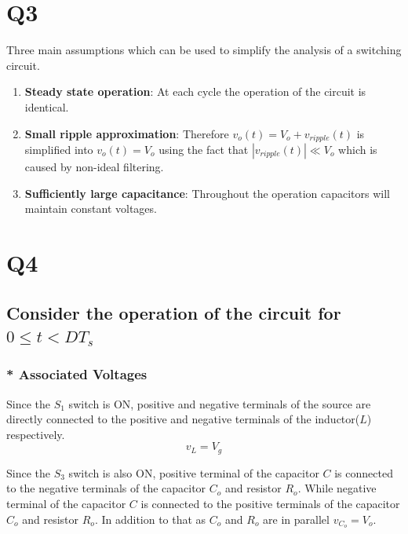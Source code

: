 \documentclass[a4paper,11pt]{article}%
\begin{document}
\section*{Q3}
Three main assumptions which can be used to simplify the analysis of a switching	circuit.
\begin{enumerate}
	\item \textbf{Steady state operation}: At each cycle the operation of the circuit is identical.
	\item \textbf{Small ripple approximation}: Therefore $ v_o(t) = V_o + v_{ripple}(t)$ is simplified into $v_o(t) = V_o$ using the fact that $| v_{ripple}(t)| \ll V_o$ which is caused by non-ideal filtering.

	\item \textbf{Sufficiently large capacitance}: Throughout the operation capacitors will maintain constant voltages.
\end{enumerate}

\pagebreak
\section*{Q4}

\subsection*{Consider the operation of the circuit for $0\leq t < DT_s$}

\subsubsection*{* Associated Voltages}
Since the $S_1$ switch is ON, positive and negative terminals of the source are directly connected to the positive and negative terminals of the inductor($L$) respectively.
\begin{equation}
	 v_L =  V_g
	 \label{first}
\end{equation}


Since the $S_3$ switch is also ON, positive terminal of the capacitor $C$ is connected to the negative terminals of the capacitor $C_o$ and resistor $R_o$. While negative terminal of the capacitor $C$ is connected to the positive terminals of the capacitor $C_o$ and resistor $R_o$. In addition to that as $C_o$ and $R_o$ are in parallel $v_{C_o} = V_o$.\\
\end{document}
